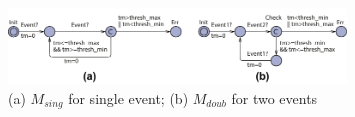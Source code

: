 %
\begin{figure}[!t]
		\centering
		\includegraphics[width=0.8\textwidth]{figs/monitor.pdf}
		\caption{\small (a) $M_{sing}$ for single event; (b) $M_{doub}$ for two events}
		  \vspace{-10pt}
		\label{fig:monitor}
\end{figure}
